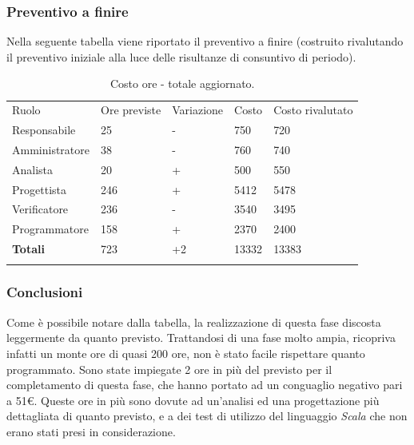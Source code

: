 \documentclass[a4paper]{article}
\begin{document}
				\subsubsection{Preventivo a finire}
					Nella seguente tabella viene riportato il preventivo a finire (costruito rivalutando il preventivo iniziale alla luce delle risultanze 
					di consuntivo di periodo).
					\begin{table}[H]
						\begin{tabularx}{\textwidth}{Y Y Y Y Y}
							Ruolo & Ore previste & Variazione & Costo & Costo rivalutato\\
							Responsabile & 25 & - & 750 & 720 \\
							Amministratore & 38 & - & 760 & 740 \\
							Analista & 20 & + & 500 & 550\\
							Progettista & 246 & + & 5412 & 5478\\
							Verificatore & 236 & - & 3540 & 3495\\
							Programmatore & 158 & + & 2370 & 2400\\
							\textbf{Totali} & 723 & +2 & 13332 & 13383\\
						\end{tabularx}
					\caption{Costo ore - totale aggiornato.}
					\label{TCRendicontati}
					\end{table}
				
				\subsubsection{Conclusioni}
                    Come è possibile notare dalla tabella, la realizzazione di questa fase discosta leggermente da quanto previsto. Trattandosi di una fase 
                    molto ampia, ricopriva infatti un monte ore di quasi 200 ore, non è stato facile rispettare quanto programmato. Sono state impiegate 
                    2 ore in più del previsto per il completamento di questa fase, che hanno portato ad un conguaglio negativo pari a 51\euro.
                    Queste ore in più sono dovute ad un'analisi ed una progettazione più dettagliata di quanto previsto, e a dei test di utilizzo del 
                    linguaggio \emph{Scala} che non erano stati presi in considerazione. 
                    
\end{document}
